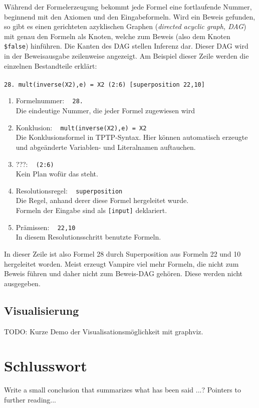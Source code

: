 \documentclass{article}
\begin{document}
Während der Formelerzeugung bekommt jede Formel eine fortlaufende Nummer, beginnend mit den Axiomen und den Eingabeformeln. Wird ein Beweis gefunden, so gibt es einen gerichteten azyklischen Graphen (\emph{directed acyclic graph, DAG}) mit genau den Formeln als Knoten, welche zum Beweis (also dem Knoten \texttt{\$false}) hinführen. Die Kanten des DAG stellen Inferenz dar. Dieser DAG wird in der Beweisausgabe zeilenweise angezeigt. 
Am Beispiel dieser Zeile werden die einzelnen Bestandteile erklärt:\\ \\
\texttt{28. mult(inverse(X2),e) = X2 (2:6) [superposition 22,10]}
\begin{enumerate}
	\itemsep0em 
	\item Formelnummer: ~ \verb|28.|\\
	Die eindeutige Nummer, die jeder Formel zugewiesen wird
	\item Konklusion: ~ \verb|mult(inverse(X2),e) = X2|\\
	Die Konklusionsformel in TPTP-Syntax. Hier können automatisch erzeugte und abgeänderte
	Variablen- und Literalnamen auftauchen.
	\item ???: ~ \verb|(2:6)|\\
	Kein Plan wofür das steht.
	\item Resolutionsregel: ~ \verb|superposition|\\
	Die Regel, anhand derer diese Formel hergeleitet wurde.\\
	Formeln der Eingabe sind als \verb|[input]| deklariert.
	\item Prämissen: ~ \verb|22,10|\\
	In diesem Resolutionsschritt benutzte Formeln.
\end{enumerate}
In dieser Zeile ist also Formel 28 durch Superposition aus Formeln 22 und 10 hergeleitet worden.
Meist erzeugt Vampire viel mehr Formeln, die nicht zum Beweis führen und daher nicht zum Beweis-DAG gehören. Diese werden nicht ausgegeben.

\subsection{Visualisierung}
\label{subsec:outputvis}

TODO: Kurze Demo der Visualisationsmöglichkeit mit graphviz.

\section{Schlusswort}
\label{sec:conclusion}
Write a small conclusion that summarizes what has been said ...?
Pointers to further reading...





\end{document}
